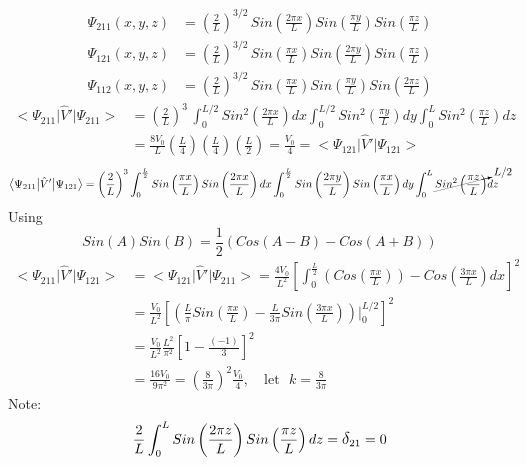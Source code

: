 \documentclass[12pt,fancychapters]{report}
\numberwithin{equation}{section}
\begin{document}
\begin{align*}
  \Psi_{211}(x,y,z) &= \left(\frac{2}{L}\right)^{3/2}\,Sin\left(\frac{2\pi x}{L}\right)Sin\left(
  \frac{\pi y}{L}\right)Sin\left(\frac{\pi z}{L}\right)\\
\Psi_{121}(x,y,z) &= \left(\frac{2}{L}\right)^{3/2}\,Sin\left(\frac{\pi x}{L}\right)Sin\left(
  \frac{2\pi y}{L}\right)Sin\left(\frac{\pi z}{L}\right)\\
  \Psi_{112}(x,y,z) &= \left(\frac{2}{L}\right)^{3/2}\,Sin\left(\frac{\pi x}{L}\right)Sin\left(
  \frac{\pi y}{L}\right)Sin\left(\frac{2\pi z}{L}\right)
\end{align*}
\begin{align*}
  \big<\Psi_{211}\big|\hat{V}'\big|\Psi_{211}\big> &= \left(\frac{2}{L}\right)^{3}\,
  \int_{0}^{L/2} Sin^2\left(\frac{2\pi x}{L}\right)dx\int_{0}^{L/2}Sin^2\left(\frac{\pi y}{L}
  \right)dy\int_{0}^{L}Sin^2\left(\frac{\pi z}{L}\right)dz\\
  &= \frac{8V_0}{L}\left(\frac{L}{4}\right)\left(\frac{L}{4}\right)\left(\frac{L}{2}\right)
  = \frac{V_0}{4}= \big<\Psi_{121}\big|\hat{V}'\big|\Psi_{121}\big>
\end{align*}
\begin{align*}
\big<\Psi_{211}\big|\hat{V}'\big|\Psi_{121}\big> &=\left(\frac{2}{L}\right)^{3}
\int_{0}^{\frac{L}{2}} Sin\left(\frac{\pi x}{L}\right)Sin\left(\frac{2\pi x}{L}\right)dx
\int_{0}^{\frac{L}{2}}Sin\left(\frac{2\pi y}{L}\right)Sin\left(\frac{\pi x}{L}\right) dy
\int_{0}^{L}\cancelto{L/2}{Sin^2\left(\frac{\pi z}{L}\right)}dz
\end{align*}
Using
\[
  \boxed{Sin(A)Sin(B) = \frac{1}{2}\left(Cos(A-B)- Cos(A+B)\right)}
\]
\begin{align*}
 \big<\Psi_{211}\big|\hat{V}'\big|\Psi_{121}\big> 
 &= \big<\Psi_{121}\big|\hat{V}'\big|\Psi_{211}\big> = \frac{4V_0}{L^2}\left[\int_{0}^{\frac{L}{2}
 }\left(Cos\left(\frac{\pi x}{L}\right) \right)-Cos\left(\frac{3\pi x}{L} \right)dx \right]^2\\
 &= \frac{V_0}{L^2}\left[\left(\frac{L}{\pi}Sin\left(\frac{\pi x}{L}\right) - \frac{L}{3\pi}
 Sin\left(\frac{3\pi x}{L}\right)\right)\Bigg|_{0}^{L/2}\right]^2\\
 &= \frac{V_0}{L^2}\frac{L^2}{\pi^2}\left[1 - \frac{(-1)}{3}\right]^2\\
 &= \frac{16V_0}{9\pi^2} = \left(\frac{8}{3\pi}\right)^2 \frac{V_0}{4},\quad\text{let }\,\, k =
 \frac{8}{3\pi}
\end{align*}
Note:
\[
  \frac{2}{L}\int_{0}^{L}Sin\left(\frac{2\pi z}{L}\right)Sin\left(\frac{\pi z}{L}\right)dz =
  \mathlarger{\delta}_{21}=0
\]
\end{document}
